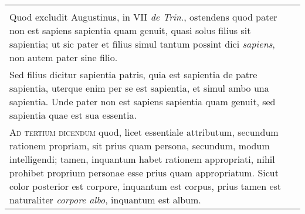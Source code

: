 \documentclass[10pt]{jsarticle} %
\begin{document}
\begin{longtable}{p{21em}p{21em}}
&

\\



Quod excludit Augustinus, in VII \textit{de Trin}.,
ostendens quod pater non est sapiens sapientia quam genuit, quasi solus filius
sit sapientia; ut sic pater et filius simul tantum possint dici \textit{sapiens}, non
autem pater sine filio. 



&

\\



Sed filius dicitur sapientia patris, quia est sapientia
de patre sapientia, uterque enim per se est sapientia, et simul ambo una
sapientia. Unde pater non est sapiens sapientia quam genuit, sed sapientia quae
est sua essentia.


&

\\


\textsc{Ad tertium dicendum} quod, licet essentiale attributum, secundum rationem
propriam, sit prius quam persona, secundum, modum intelligendi; tamen,
inquantum habet rationem appropriati, nihil prohibet proprium personae esse
prius quam appropriatum. Sicut color posterior est corpore, inquantum est
corpus, prius tamen est naturaliter \textit{corpore albo}, inquantum est album.


&



\end{longtable}
\newpage
\end{document}
